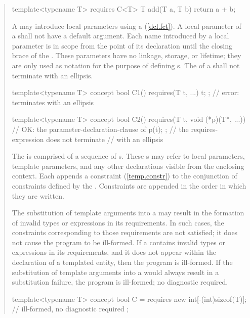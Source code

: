 \begin{quote}
\begin{codeblock}
template<typename T> requires C<T> 
  T add(T a, T b) { return a + b; }
\end{codeblock}
\exitnote

\pnum
A  may introduce local parameters using a
(\ref{dcl.fct}). 
%
A local parameter of a  shall not have a 
default argument.
%
Each name introduced by a local parameter is in scope from the point
of its declaration until the closing brace of the
.
%
These parameters have no linkage, storage, or lifetime; they are only used
as notation for the purpose of defining s.
%
The  of a 
 shall
not terminate with an ellipsis.
\enterexample
\begin{codeblock}
template<typename T>
  concept bool C1() { 
    requires(T t, ...) { t; }; // error: terminates with an ellipsis
  }

template<typename T>
  concept bool C2() { 
    requires(T t, void (*p)(T*, ...)) // OK: the parameter-declaration-clause of
    { p(t); };                        // the requires-expression does not terminate 
  }                                   // with an ellipsis
\end{codeblock}
\exitexample

\pnum
The  is comprised of 
a sequence of s.
%
These s may refer to local 
parameters, template parameters, and any other declarations visible from the 
enclosing context. 
%
Each  appends a constraint (\ref{temp.constr}) to 
the conjunction of constraints defined by the
. Constraints are appended in the order
in which they are written.

\pnum
The substitution of template arguments into a  
may result in the formation of invalid types or expressions in its
requirements. In such cases, the constraints corresponding to those
requirements are not satisfied; it does not cause the program to be ill-formed.
\enternote
If a  contains invalid types or expressions in
its requirements, and it does not appear within the declaration of a templated
entity, then the program is ill-formed.
\exitnote
If the substitution of template arguments into a  
would always result in a substitution failure, the program is ill-formed; 
no diagnostic required.
%
\enterexample
\begin{codeblock}
template<typename T> concept bool C =
  requires {
    new int[-(int)sizeof(T)]; // ill-formed, no diagnostic required
  };
\end{codeblock}
\exitexample



\end{quote}
